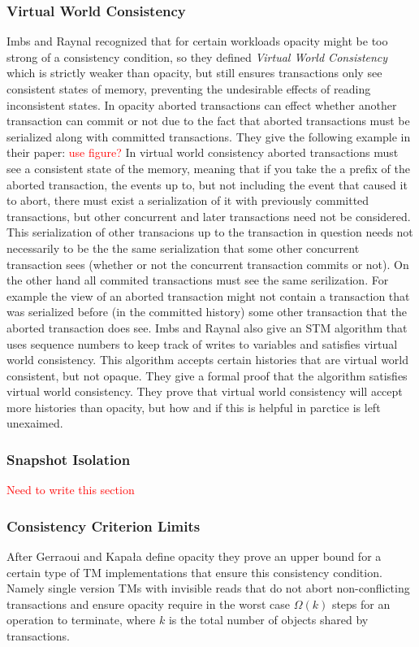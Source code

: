 \subsubsection{Virtual World Consistency}
Imbs and Raynal recognized that for certain workloads opacity might be too strong of a consistency condition, so they defined \emph{Virtual World Consistency} which is strictly weaker than opacity, but still ensures transactions only see consistent states of memory, preventing the undesirable effects of reading inconsistent states.
In opacity aborted transactions can effect whether another transaction can commit or not due to the fact that aborted transactions must be serialized along with committed transactions.
They give the following example in their paper:
\textcolor{Red}{use figure?}
In virtual world consistency aborted transactions must see a consistent state of the memory, meaning that if you take the a prefix of the aborted transaction, the events up to, but not including the event that caused it to abort, there must exist a serialization of it with previously committed transactions, but other concurrent and later transactions need not be considered.
This serialization of other transacions up to the transaction in question needs not necessarily to be the the same serialization that some other concurrent transaction sees (whether or not the concurrent transaction commits or not).
On the other hand all commited transactions must see the same serilization.
For example the view of an aborted transaction might not contain a transaction that was serialized before (in the committed history) some other transaction that the aborted transaction does see.
Imbs and Raynal also give an STM algorithm that uses sequence numbers to keep track of writes to variables and satisfies virtual world consistency.  This algorithm accepts certain histories that are virtual world consistent, but not opaque.  They give a formal proof that the algorithm satisfies virtual world consistency.
They prove that virtual world consistency will accept more histories than opacity, but how and if this is helpful in parctice is left unexaimed.

\subsubsection{Snapshot Isolation}
\textcolor{Red}{Need to write this section}

\subsubsection{Consistency Criterion Limits}
After Gerraoui and Kapa\l{}a define opacity \cite{LPD-CONF-2007-017} they prove an upper bound for a certain type of TM implementations that ensure this consistency condition.
Namely single version TMs with invisible reads that do not abort non-conflicting transactions and ensure opacity require in the worst case $\Omega{}(k)$ steps for an operation to terminate, where $k$ is the total number of objects shared by transactions.


